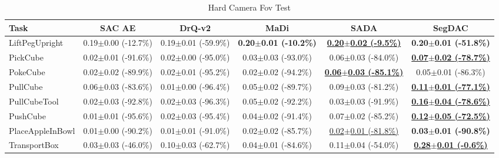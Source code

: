\begin{table}[htbp]
\centering
\scriptsize
\caption{Hard Camera Fov Test}
\label{tab:appendix_camerafovtest_hard}
\begin{adjustbox}{max width=\textwidth}
\begin{tabular}{l*{5}{c}}
\toprule
\textbf{Task} & \textbf{SAC AE} & \textbf{DrQ-v2} & \textbf{MaDi} & \textbf{SADA} & \textbf{SegDAC} \\
\midrule
LiftPegUpright & 0.19$\pm$0.00 \scriptsize{(-12.7\%)} & 0.19$\pm$0.01 \scriptsize{(-59.9\%)} & \textbf{0.20$\pm$0.01 \scriptsize{(-10.2\%)}} & \textbf{\underline{0.20$\pm$0.02 \scriptsize{(-9.5\%)}}} & \textbf{0.20$\pm$0.01 \scriptsize{(-51.8\%)}} \\
PickCube & 0.02$\pm$0.01 \scriptsize{(-91.6\%)} & 0.02$\pm$0.00 \scriptsize{(-95.0\%)} & 0.03$\pm$0.03 \scriptsize{(-93.0\%)} & 0.06$\pm$0.03 \scriptsize{(-84.0\%)} & \textbf{\underline{0.07$\pm$0.02 \scriptsize{(-78.7\%)}}} \\
PokeCube & 0.02$\pm$0.02 \scriptsize{(-89.9\%)} & 0.02$\pm$0.01 \scriptsize{(-95.2\%)} & 0.02$\pm$0.02 \scriptsize{(-94.2\%)} & \textbf{\underline{0.06$\pm$0.03 \scriptsize{(-85.1\%)}}} & 0.05$\pm$0.01 \scriptsize{(-86.3\%)} \\
PullCube & 0.06$\pm$0.03 \scriptsize{(-83.6\%)} & 0.01$\pm$0.00 \scriptsize{(-96.4\%)} & 0.05$\pm$0.02 \scriptsize{(-89.7\%)} & 0.09$\pm$0.03 \scriptsize{(-81.2\%)} & \textbf{\underline{0.11$\pm$0.01 \scriptsize{(-77.1\%)}}} \\
PullCubeTool & 0.02$\pm$0.03 \scriptsize{(-92.8\%)} & 0.02$\pm$0.03 \scriptsize{(-96.3\%)} & 0.05$\pm$0.02 \scriptsize{(-92.2\%)} & 0.03$\pm$0.03 \scriptsize{(-91.9\%)} & \textbf{\underline{0.16$\pm$0.04 \scriptsize{(-78.6\%)}}} \\
PushCube & 0.01$\pm$0.01 \scriptsize{(-95.6\%)} & 0.02$\pm$0.03 \scriptsize{(-95.4\%)} & 0.04$\pm$0.02 \scriptsize{(-91.4\%)} & 0.07$\pm$0.02 \scriptsize{(-85.2\%)} & \textbf{\underline{0.12$\pm$0.05 \scriptsize{(-72.5\%)}}} \\
PlaceAppleInBowl & 0.01$\pm$0.00 \scriptsize{(-90.2\%)} & 0.01$\pm$0.01 \scriptsize{(-91.0\%)} & 0.02$\pm$0.02 \scriptsize{(-85.7\%)} & \underline{0.02$\pm$0.01 \scriptsize{(-81.8\%)}} & \textbf{0.03$\pm$0.01 \scriptsize{(-90.8\%)}} \\
TransportBox & 0.03$\pm$0.03 \scriptsize{(-46.0\%)} & 0.10$\pm$0.03 \scriptsize{(-62.7\%)} & 0.04$\pm$0.01 \scriptsize{(-84.6\%)} & 0.11$\pm$0.04 \scriptsize{(-54.0\%)} & \textbf{\underline{0.28$\pm$0.01 \scriptsize{(-0.6\%)}}} \\
\bottomrule
\end{tabular}
\end{adjustbox}
\end{table}

